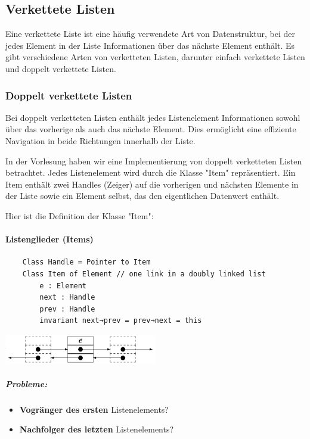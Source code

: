 \newpage

\subsection{Verkettete Listen}
Eine verkettete Liste ist eine häufig verwendete Art von Datenstruktur, bei der jedes Element in der Liste Informationen über das nächste Element enthält. Es gibt verschiedene Arten von verketteten Listen, darunter einfach verkettete Listen und doppelt verkettete Listen.

\subsubsection{Doppelt verkettete Listen}
Bei doppelt verketteten Listen enthält jedes Listenelement Informationen sowohl über das vorherige als auch das nächste Element. Dies ermöglicht eine effiziente Navigation in beide Richtungen innerhalb der Liste.

In der Vorlesung haben wir eine Implementierung von doppelt verketteten Listen betrachtet. Jedes Listenelement wird durch die Klasse "Item" repräsentiert. Ein Item enthält zwei Handles (Zeiger) auf die vorherigen und nächsten Elemente in der Liste sowie ein Element selbst, das den eigentlichen Datenwert enthält.

Hier ist die Definition der Klasse "Item":


\paragraph{Listenglieder (Items)}
\begin{verbatim}
    Class Handle = Pointer to Item
    Class Item of Element // one link in a doubly linked list
        e : Element
        next : Handle 
        prev : Handle
        invariant next→prev = prev→next = this
\end{verbatim}

\begin{center}
    \centering
    \includegraphics[width=0.5\textwidth]{folgen-felder-listen/abb_1.png}
    \label{fig:abb_1}
\end{center}

\subparagraph{Probleme:}

\begin{itemize}
    \item \textbf{Vogränger des ersten} Listenelements?
    \item \textbf{Nachfolger des letzten} Listenelements?
\end{itemize}

